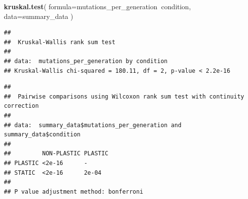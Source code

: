 \documentclass[]{book}
\newenvironment{Shaded}{\begin{snugshade}}{\end{snugshade}}
\newcommand{\DataTypeTok}[1]{\textcolor[rgb]{0.13,0.29,0.53}{#1}}
\newcommand{\KeywordTok}[1]{\textcolor[rgb]{0.13,0.29,0.53}{\textbf{#1}}}
\newcommand{\NormalTok}[1]{#1}
\newcommand{\OperatorTok}[1]{\textcolor[rgb]{0.81,0.36,0.00}{\textbf{#1}}}
\newcommand{\StringTok}[1]{\textcolor[rgb]{0.31,0.60,0.02}{#1}}
\begin{document}
\begin{Shaded}
\begin{Highlighting}[]
\KeywordTok{kruskal.test}\NormalTok{(}
  \DataTypeTok{formula=}\NormalTok{mutations_per_generation}\OperatorTok{~}\NormalTok{condition,}
  \DataTypeTok{data=}\NormalTok{summary_data}
\NormalTok{)}
\end{Highlighting}
\end{Shaded}

\begin{verbatim}
## 
##  Kruskal-Wallis rank sum test
## 
## data:  mutations_per_generation by condition
## Kruskal-Wallis chi-squared = 180.11, df = 2, p-value < 2.2e-16
\end{verbatim}

\begin{Shaded}
\end{Shaded}

\begin{verbatim}
## 
##  Pairwise comparisons using Wilcoxon rank sum test with continuity correction 
## 
## data:  summary_data$mutations_per_generation and summary_data$condition 
## 
##         NON-PLASTIC PLASTIC
## PLASTIC <2e-16      -      
## STATIC  <2e-16      2e-04  
## 
## P value adjustment method: bonferroni
\end{verbatim}

\begin{Shaded}
\end{Shaded}
\end{document}
